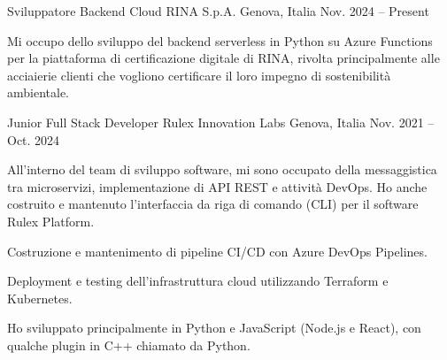 


\begin{cventries}


\cventry
{Sviluppatore Backend Cloud} %
{RINA S.p.A.} %
{Genova, Italia} %
{Nov. 2024 -- Present} %
{ %
\begin{cvitems}
  \item {Mi occupo dello sviluppo del backend serverless in Python su Azure Functions per la piattaforma di certificazione digitale di RINA, rivolta principalmente alle acciaierie clienti che vogliono certificare il loro impegno di sostenibilità ambientale.}
\end{cvitems}
}


\cventry
{Junior Full Stack Developer} %
{Rulex Innovation Labs} %
{Genova, Italia} %
{Nov. 2021 -- Oct. 2024} %
{ %
\begin{cvitems}
\item {
    All'interno del team di sviluppo software, mi sono occupato della messaggistica tra microservizi, implementazione di API REST e attività DevOps.
    Ho anche costruito e mantenuto l'interfaccia da riga di comando (CLI) per il software Rulex Platform.
}
\item {Costruzione e mantenimento di pipeline CI/CD con Azure DevOps Pipelines.}
\item {Deployment e testing dell'infrastruttura cloud utilizzando Terraform e Kubernetes.}
\item {Ho sviluppato principalmente in Python e JavaScript (Node.js e React), con qualche plugin in C++ chiamato da Python.}
\end{cvitems}
}



\end{cventries}
